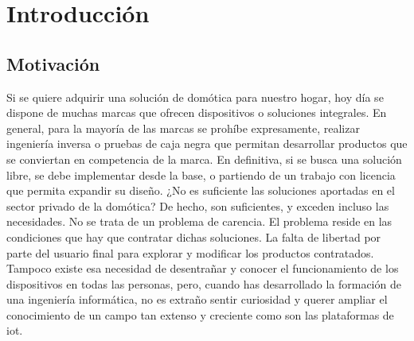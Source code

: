 \cleardoublepage

\chapter{Introducción}

\section{Motivación}
\label{ch:Capitulo1}

Si se quiere adquirir una solución de domótica para nuestro hogar, hoy día se dispone de muchas marcas que ofrecen dispositivos o soluciones integrales. En general, para la mayoría de las marcas se prohíbe expresamente, realizar ingeniería inversa o pruebas de caja negra que permitan desarrollar productos que se conviertan en competencia de la marca. En definitiva, si se busca una solución libre, se debe implementar desde la base, o partiendo de un trabajo con licencia que permita expandir su diseño. ¿No es suficiente las soluciones aportadas en el sector privado de la domótica? De hecho, son suficientes, y exceden incluso las necesidades. No se trata de un problema de carencia. El problema reside en las condiciones que hay que contratar dichas soluciones. La falta de libertad por parte del usuario final para explorar y modificar los productos contratados. Tampoco existe esa necesidad de desentrañar y conocer el funcionamiento de los dispositivos en todas las personas, pero, cuando has desarrollado la formación de una ingeniería informática, no es extraño sentir curiosidad y querer ampliar el conocimiento de un campo tan extenso y creciente como son las plataformas de \gls{iot}.

\vspace{1cm}

